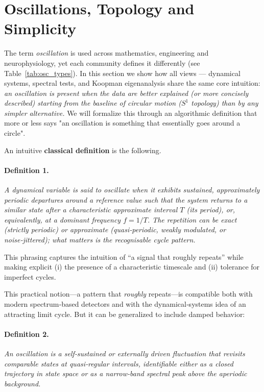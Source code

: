 \section{Oscillations, Topology and Simplicity}
\label{app:oscillation}
\noindent
The term \textit{oscillation} is used across mathematics, engineering and neurophysiology, yet each community defines it  differently  (see Table~\ref{tab:osc_types}).  In this section we show how
all views — dynamical systems, spectral tests, and Koopman eigenanalysis share the same core intuition: \textit{an oscillation is present when the data are better explained (or more concisely described) starting from the baseline of circular motion ($S^1$ topology) than by any simpler alternative.} We will formalize this through an algorithmic definition that more or less says "an oscillation is something that essentially goes around a circle". 


An intuitive \textbf{classical definition} is the following.

 
\paragraph{Definition 1.}
\emph{A dynamical variable is said to oscillate when it exhibits sustained, approximately periodic departures around a reference value such that the system returns to a similar state after a characteristic approximate interval $T$ (its period), or, equivalently, at a dominant frequency $f=1/T$.  The repetition can be exact (strictly periodic) or approximate (quasi‑periodic, weakly modulated, or noise‑jittered); what matters is the recognisable cycle pattern.}
 

This phrasing captures the intuition of ``a signal that roughly repeats'' while making explicit (i) the presence of a characteristic timescale and (ii) tolerance for imperfect cycles.




This practical notion—a pattern that \emph{roughly} repeats—is compatible both with modern spectrum‑based detectors and with the dynamical‑systems idea of an attracting limit cycle.  But it can be generalized to include damped behavior:

 
\paragraph{Definition 2.}
\emph{An oscillation is a self‑sustained or externally driven fluctuation that revisits comparable states at quasi‑regular intervals, identifiable either as a closed trajectory in state space or as a narrow‑band spectral peak above the aperiodic background.}
 

